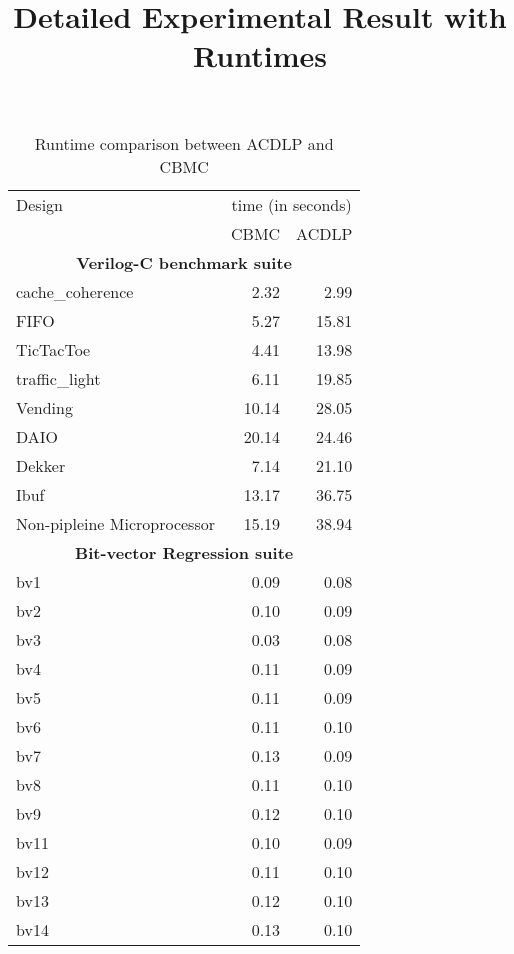 \documentclass{article}
\begin{document}
\title{Detailed Experimental Result with Runtimes}
\date{}
\maketitle 
%
\begin{table}[!b]
\begin{center}
{
\begin{tabular}{l|r|r}
\hline
  Design & \multicolumn{2}{c}{time (in seconds)} \\ 
  \cline{2-3}
  & CBMC & ACDLP \\ \hline
  \multicolumn{3}{c}{\textbf{Verilog-C benchmark suite}} \\ \hline 
  cache\_coherence & 2.32 & 2.99 \\ \hline  
  FIFO & 5.27 & 15.81 \\ \hline
  TicTacToe & 4.41 & 13.98 \\ \hline
  traffic\_light & 6.11 & 19.85 \\ \hline
  Vending & 10.14 & 28.05 \\ \hline 
  DAIO & 20.14 & 24.46 \\ \hline 
  Dekker & 7.14 & 21.10 \\ \hline 
  Ibuf & 13.17 & 36.75 \\ \hline
  Non-pipleine Microprocessor & 15.19 & 38.94 \\ \hline
  \multicolumn{3}{c}{\textbf{Bit-vector Regression suite}} \\ \hline 
  bv1 & 0.09 & 0.08 \\ \hline
  bv2 & 0.10 & 0.09 \\ \hline
  bv3 & 0.03 & 0.08 \\ \hline
  bv4 & 0.11 & 0.09 \\ \hline
  bv5 & 0.11 & 0.09 \\ \hline
  bv6 & 0.11 & 0.10 \\ \hline 
  bv7 & 0.13 & 0.09 \\ \hline 
  bv8 & 0.11 & 0.10 \\ \hline
  bv9 & 0.12 & 0.10 \\ \hline
  bv11 & 0.10 & 0.09 \\ \hline
  bv12 & 0.11 & 0.10 \\ \hline
  bv13 & 0.12 & 0.10 \\ \hline
  bv14 & 0.13 & 0.10 \\ \hline
\end{tabular}
}
\end{center}
\caption{Runtime comparison between ACDLP and CBMC}
\label{solver2}
\end{table}
\end{document}
